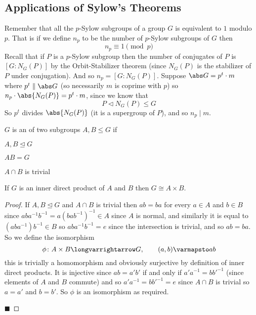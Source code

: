 \documentclass[10pt]{article}
\let\divides=\mid
\def\maxdivs{\mathrel{\|}}
\let\normalsub=\trianglelefteq
\begin{document}


\bigskip

\subsection{Applications of Sylow's Theorems}

Remember that all the $p$-Sylow subgroups of a group $G$ is equivalent to $1$ modulo $p$.
That is if we define $n_p$ to be the number of $p$-Sylow subgroups of $G$ then
\[ n_p\equiv1\pmod p \]
Recall that if $P$ is a $p$-Sylow subgroup then the number of conjugates of $P$ is $[G:N_G(P)]$ by the Orbit-Stabilizer theorem (since $N_G(P)$ is the stabilizer of $P$ under conjugation).
And so $n_p=[G:N_G(P)]$.
Suppose $\abs G=p^t\cdot m$ where $p^t\maxdivs\abs G$ (so necessarily $m$ is coprime with $p$) so $n_p\cdot\abs{N_G(P)}=p^t\cdot m$, since we know that
\[ P\triangleleft N_G(P)\leq G \]
So $p^t$ divides $\abs{N_G(P)}$ (it is a supergroup of $P$), and so $n_p\divides m$.

\begin{defn*}

    $G$ is an  of two subgroups $A,B\leq G$ if
    \benum
        \item $A,B\normalsub G$
        \item $AB=G$
        \item $A\cap B$ is trivial
    \eenum

\end{defn*}

\begin{prop*}

    If $G$ is an inner direct product of $A$ and $B$ then $G\cong A\times B$.

\end{prop*}

\begin{proof}

    If $A,B\normalsub G$ and $A\cap B$ is trivial then $ab=ba$ for every $a\in A$ and $b\in B$ since $aba^{-1}b^{-1}=a(bab^{-1})^{-1}\in A$ since $A$ is normal, and similarly it is equal to
    $(aba^{-1})b^{-1}\in B$ so $aba^{-1}b^{-1}=e$ since the intersection is trivial, and so $ab=ba$.
    So we define the isomorphism
    \[ \phi\colon A\times B\longvarrightarrow G,\qquad (a,b)\varmapsto ab \]
    this is trivially a homomorphism and obviously surjective by definition of inner direct products.
    It is injective since $ab=a'b'$ if and only if $a'a^{-1}=bb'^{-1}$ (since elements of $A$ and $B$ commute) and so $a'a^{-1}=bb'^{-1}=e$ since $A\cap B$ is trivial so $a=a'$ and $b=b'$.
    So $\phi$ is an isomorphism as required.

    \hfill$\blacksquare$

\end{proof}
\end{document}
